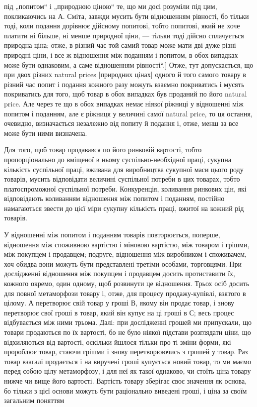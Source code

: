 під „попитом“ і „природною ціною“ те, що ми досі розуміли під
цим, покликаючись на А. Сміта, завжди мусить бути відношенням
рівності, бо тільки тоді, коли подання дорівнює дійсному
попитові, тобто попитові, який не хоче платити ні більше,
ні менше природної ціни, — тільки тоді дійсно сплачується природна
ціна; отже, в різний час той самий товар може мати дві
дуже різні природні ціни, і все ж відношення між поданням
і попитом, в обох випадках може бути однаковим, а саме
відношенням рівності“.] Отже, тут допускається, що при двох
різних natural prices [природних цінах] одного й того самого
товару в різний час попит і подання кожного разу можуть взаємно
покриватись і мусять покриватись для того, щоб товар
в обох випадках був проданий по його natural price. Але через
те що в обох випадках немає ніякої ріжниці у відношенні між
попитом і поданням, але є ріжниця у величині самої natural
price, то ця остання, очевидно, визначається незалежно від попиту
й подання і, отже, менш за все може бути ними визначена.

Для того, щоб товар продавався по його ринковій вартості,
тобто пропорціонально до вміщеної в ньому суспільно-необхідної
праці, сукупна кількість суспільної праці, вживана для
виробництва сукупної маси цього роду товарів, мусить відповідати
величині суспільної потреби в цих товарах, тобто платоспроможної
суспільної потреби. Конкуренція, коливання ринкових
цін, які відповідають коливанням відношення між попитом
і поданням, постійно намагаються звести до цієї міри сукупну
кількість праці, вжитої на кожний рід товарів.

У відношенні між попитом і поданням товарів повторюється,
поперше, відношення між споживною вартістю і міновою вартістю,
між товаром і грішми, між покупцем і продавцем; подруге,
відношення між виробником і споживачем, хоч обидва
вони можуть бути представлені третіми особами, торговцями.
При дослідженні відношення між покупцем і продавцем досить
протиставити їх, кожного окремо, один одному, щоб розвинути
це відношення. Трьох осіб досить для повної метаморфози
товару і, отже, для процесу продажу-купівлі, взятого в цілому.
А перетворює свій товар у гроші В, якому він продає товар,
і знову перетворює свої гроші в товар, який він купує на ці
гроші в С; весь процес відбувається між ними трьома. Далі:
при дослідженні грошей ми припускали, що товари продаються
по їх вартості, бо не було ніякої підстави розглядати ціни, що
відхиляються від вартості, оскільки йшлося тільки про ті зміни
форми, які пророблює товар, стаючи грішми і знову перетворюючись
з грошей у товар. Раз товар взагалі продається і на
виручені гроші купується новий товар, то ми маємо перед
собою цілу метаморфозу, і для неї як такої однаково, чи стоїть
ціна товару нижче чи вище його вартості. Вартість товару зберігає
своє значення як основа, бо тільки з цієї основи можуть бути
раціонально виведені гроші, і ціна за своїм загальним поняттям
